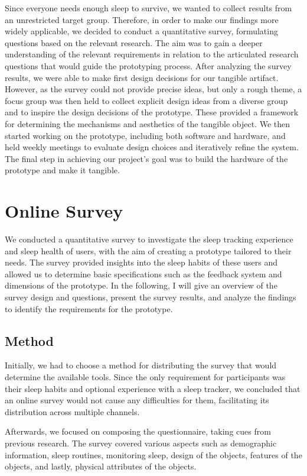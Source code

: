\documentclass[
  a4paper,  %
  twoside,  %
  bibliography=totoc,
  headsepline,
  cleardoublepage=empty,
  parskip=half,
  draft=false
]{scrbook}
\begin{document}
Since everyone needs enough sleep to survive, we wanted to collect results from an unrestricted target group. Therefore, in order to make our findings more widely applicable, we decided to conduct a quantitative survey, formulating questions based on the relevant research. The aim was to gain a deeper understanding of the relevant requirements in relation to the articulated research questions that would guide the prototyping process. After analyzing the survey results, we were able to make first design decisions for our tangible artifact. However, as the survey could not provide precise ideas, but only a rough theme, a focus group was then held to collect explicit design ideas from a diverse group and to inspire the design decisions of the prototype. These provided a framework for determining the mechanisms and aesthetics of the tangible object. We then started working on the prototype, including both software and hardware, and held weekly meetings to evaluate design choices and iteratively refine the system. The final step in achieving our project's goal was to build the hardware of the prototype and make it tangible.

\chapter{Online Survey}
We conducted a quantitative survey to investigate the sleep tracking experience and sleep health of users, with the aim of creating a prototype tailored to their needs. The survey provided insights into the sleep habits of these users and allowed us to determine basic specifications such as the feedback system and dimensions of the prototype. In the following, I will give an overview of the survey design and questions, present the survey results, and analyze the findings to identify the requirements for the prototype.

\section{Method}
Initially, we had to choose a method for distributing the survey that would determine the available tools. Since the only requirement for participants was their sleep habits and optional experience with a sleep tracker, we concluded that an online survey would not cause any difficulties for them, facilitating its distribution across multiple channels.

Afterwards, we focused on composing the questionnaire, taking cues from previous research. The survey covered various aspects such as demographic information, sleep routines, monitoring sleep, design of the objects, features of the objects, and lastly, physical attributes of the objects.
\end{document}
